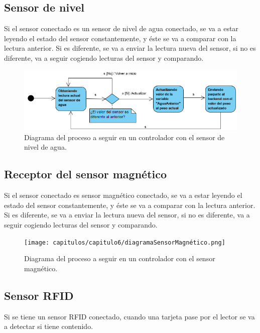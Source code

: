 \subsection{Sensor de nivel}
Si el sensor conectado es un sensor de nivel de agua conectado, se va a estar leyendo el estado del sensor constantemente, y éste se va a comparar con la lectura anterior. Si es diferente, se va a enviar la lectura nueva del sensor, si no es diferente, va a seguir cogiendo lecturas del sensor y comparando. 

\begin{figure}[h]
    \centering
    \includegraphics[width=.80\textwidth]{capitulos/capitulo6/diagramaNivelAgua.png}
    \caption{Diagrama del proceso a seguir en un controlador con el sensor de nivel de agua.}
    \label{fig:diagramaagua}
\end{figure}

\newpage
\subsection{Receptor del sensor magnético}
Si el sensor conectado es sensor magnético conectado, se va a estar leyendo el estado del sensor constantemente, y éste se va a comparar con la lectura anterior. Si es diferente, se va a enviar la lectura nueva del sensor, si no es diferente, va a seguir cogiendo lecturas del sensor y comparando. 

\begin{figure}[h]
    \centering
    \texttt{[image: capitulos/capitulo6/diagramaSensorMagnético.png]}
    \caption{Diagrama del proceso a seguir en un controlador con el sensor magnético.}
    \label{fig:diagramamagnetico}
\end{figure}


\subsection{Sensor RFID}
Si se tiene un sensor RFID conectado, cuando una tarjeta pase por el lector se va a detectar si tiene contenido. 

